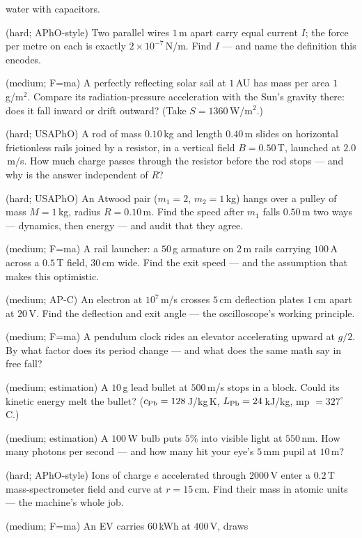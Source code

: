 \begin{description}
water with capacitors.
\item[W25] (hard; APhO-style) Two parallel wires $1$\,m apart carry
equal current $I$; the force per metre on each is exactly
$2\times10^{-7}$\,N/m. Find $I$ --- and name the definition this
encodes.
\item[W26] (medium; F=ma) A perfectly reflecting solar sail at $1$\,AU
has mass per area $1$\,g/m$^{2}$. Compare its radiation-pressure
acceleration with the Sun's gravity there: does it fall inward or
drift outward? (Take $S=1360$\,W/m$^{2}$.)
\item[W27] (hard; USAPhO) A rod of mass $0.10$\,kg and length
$0.40$\,m slides on horizontal frictionless rails joined by a
resistor, in a vertical field $B=0.50$\,T, launched at $2.0$\,m/s.
How much charge passes through the resistor before the rod stops
--- and why is the answer independent of $R$?
\item[W28] (hard; USAPhO) An Atwood pair ($m_1=2$, $m_2=1$\,kg) hangs
over a pulley of mass $M=1$\,kg, radius $R=0.10$\,m. Find the speed
after $m_1$ falls $0.50$\,m two ways --- dynamics, then energy ---
and audit that they agree.
\item[W29] (medium; F=ma) A rail launcher: a $50$\,g armature on
$2$\,m rails carrying $100$\,A across a $0.5$\,T field, $30$\,cm
wide. Find the exit speed --- and the assumption that makes this
optimistic.
\item[W30] (medium; AP-C) An electron at $10^{7}$\,m/s crosses $5$\,cm
deflection plates $1$\,cm apart at $20$\,V. Find the deflection and
exit angle --- the oscilloscope's working principle.
\item[W31] (medium; F=ma) A pendulum clock rides an elevator
accelerating upward at $g/2$. By what factor does its period change
--- and what does the same math say in free fall?
\item[W32] (medium; estimation) A $10$\,g lead bullet at $500$\,m/s
stops in a block. Could its kinetic energy melt the bullet? ($c_{\rm
Pb}=128$\,J/kg\,K, $L_{\rm Pb}=24$\,kJ/kg, mp $=327^{\circ}$\,C.)
\item[W33] (medium; estimation) A $100$\,W bulb puts $5\%$ into visible
light at $550$\,nm. How many photons per second --- and how many hit
your eye's $5$\,mm pupil at $10$\,m?
\item[W34] (hard; APhO-style) Ions of charge $e$ accelerated through
$2000$\,V enter a $0.2$\,T mass-spectrometer field and curve at
$r=15$\,cm. Find their mass in atomic units --- the machine's whole
job.
\item[W35] (medium; F=ma) An EV carries $60$\,kWh at $400$\,V, draws

\end{description}
